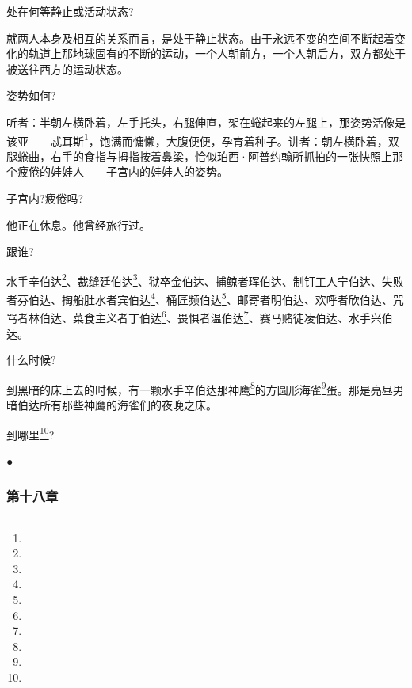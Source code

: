 \par 处在何等静止或活动状态?
\par 就两人本身及相互的关系而言，是处于静止状态。由于永远不变的空间不断起着变化的轨道上那地球固有的不断的运动，一个人朝前方，一个人朝后方，双方都处于被送往西方的运动状态。
\par 姿势如何?
\par 听者：半朝左横卧着，左手托头，右腿伸直，架在蜷起来的左腿上，那姿势活像是该亚——忒耳斯\footnote{}，饱满而慵懒，大腹便便，孕育着种子。讲者：朝左横卧着，双腿蜷曲，右手的食指与拇指按着鼻梁，恰似珀西·阿普约翰所抓拍的一张快照上那个疲倦的娃娃人——子宫内的娃娃人的姿势。
\par 子宫内?疲倦吗?
\par 他正在休息。他曾经旅行过。
\par 跟谁?
\par 水手辛伯达\footnote{}、裁缝廷伯达\footnote{}、狱卒金伯达、捕鲸者珲伯达、制钉工人宁伯达、失败者芬伯达、掏船肚水者宾伯达\footnote{}、桶匠频伯达\footnote{}、邮寄者明伯达、欢呼者欣伯达、咒骂者林伯达、菜食主义者丁伯达\footnote{}、畏惧者温伯达\footnote{}、赛马赌徒凌伯达、水手兴伯达。
\par 什么时候?
\par 到黑暗的床上去的时候，有一颗水手辛伯达那神鹰\footnote{}的方圆形海雀\footnote{}蛋。那是亮昼男暗伯达所有那些神鹰的海雀们的夜晚之床。
\par 到哪里\footnote{}?
\par ●



















\subsubsection*{第十八章}


